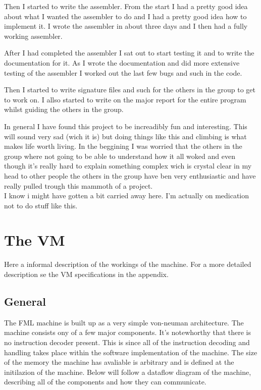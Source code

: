 \documentclass{article}
\begin{document}
Then I started to write the assembler. From the start I had a pretty good idea
about what I wanted the assembler to do and I had a pretty good idea how to
implement it. I wrote the assembler in about three days and I then had a fully
working assembler.

After I had completed the assembler I sat out to start testing it and to write
the documentation for it. As I wrote the documentation and did more extensive
testing of the assembler I worked out the last few bugs and such in the code.

Then I started to write signature files and such for the others in the group to
get to work on. I allso started to write on the major report for the entire
program whilst guiding the others in the group.

In general I have found this project to be increadibly fun and interesting.
This will sound very sad (wich it is) but doing things like this and climbing
is what makes life worth living. In the beggining I was worried that the others
in the group where not going to be able to understand how it all woked and even 
though it's really hard to explain something complex wich is crystal clear in 
my head to other people the others in
the group have ben very enthusiastic and have really pulled trough this mammoth
of a project.
\\
I know i might have gotten a bit carried away here. I'm actually on medication
not to do stuff like this.


\section{The VM}
Here a informal description of the workings of the machine. For a more detailed
description se the VM specifications in the appendix.
\subsection{General}
The FML machine is built up as a very simple von-neuman architecture. The
machine consists ony of a few major components. It's notewhorthy that there is
no instruction decoder present. This is since all of the instruction decoding
and handling takes place within the software implementation of the machine.
The size of the memory the machine has avaliable is arbitrary and is defined at
the initilazion of the machine. Below will follow a dataflow diagram of the
machine, describing all of the components and how they can communicate.  
\end{document}
